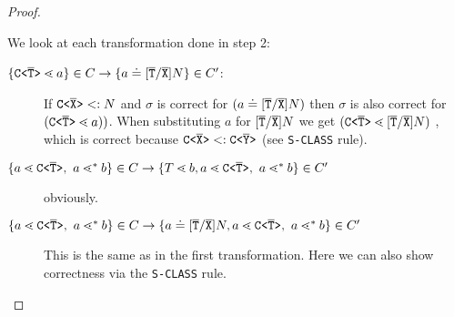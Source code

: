 \begin{proof}
\begin{description}
    We look at each transformation done in step 2:
    \begin{description}
    \item[$\{ \mathtt{C \texttt{<} \overline{\tt T} \texttt{>} } \lessdot a \} \in C \to \{ a \doteq [\overline{\tt T}/\overline{\tt X}]N \} \in C'$:]
    If $\mathtt{C \texttt{<} \overline{\tt X} \texttt{>} } <: N$ and $\sigma$ is correct for $(a \doteq [\overline{\tt T}/\overline{\tt X}]N)$
    then $\sigma$ is also correct for $(\mathtt{C \texttt{<} \overline{\tt T} \texttt{>} } \lessdot a))$.
    When substituting $a$ for $[\overline{\tt T}/\overline{\tt X}]N$ we get 
    $(\mathtt{C \texttt{<} \overline{\tt T} \texttt{>} } \lessdot [\overline{\tt T}/\overline{\tt X}]N)$
    , which is correct because $\mathtt{C \texttt{<} \overline{\tt X} \texttt{>} } <: \mathtt{C \texttt{<} \overline{\tt Y} \texttt{>} }$
    (see \texttt{S-CLASS} rule).
    \item[$\{ a \lessdot \mathtt{C \texttt{<} \overline{T} \texttt{>} },\ a \lessdot^* b \} \in C \to \{ T \lessdot b, a \lessdot \mathtt{C \texttt{<} \overline{T} \texttt{>} },\ a \lessdot^* b \} \in C'$]
    obviously.
    \item[$\{ a \lessdot \mathtt{C \texttt{<} \overline{T} \texttt{>} },\ a \lessdot^* b \} \in C \to \{ a \doteq [\overline{\tt T}/\overline{\tt X}]N, a \lessdot \mathtt{C \texttt{<} \overline{T} \texttt{>} },\ a \lessdot^* b \} \in C'$]
    This is the same as in the first transformation.
    Here we can also show correctness via the \texttt{S-CLASS} rule.
    
    \end{description}
    

\end{description}
\end{proof}
